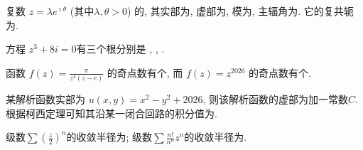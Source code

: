 \documentclass{njustexam}
\begin{document}
\renewcommand{\course}{数学物理方法}                          %
\renewcommand{\duration}{120}                                            %
\renewcommand{\credit}{5}                                                   %
\renewcommand{\syllabus}{11044102}                               %
\renewcommand{\fullmark}{100}                                            %
\renewcommand{\composer}{罗凯}            %
\renewcommand{\composedate}{2026年1月}                   %
\renewcommand{\validator}{}                                        %
\renewcommand{\coursetype}{1}                                            %
\renewcommand{\exammethod}{1}                                         %
\renewcommand{\testpaper}{A}                                              %

\makehead %



\begin{problem}
  复数 $z = \lambda e^{\imath \theta}$ (其中$\lambda, \theta  > 0$) 的, 
  其实部为\fillout{$\lambda \cos \theta$}, 虚部为\fillout{$\lambda \sin \theta$}, 
  模为\fillout{$\lambda$}, 主辐角为\fillout{$\theta$}. 
 它的复共轭为.
  \end{problem}
  
  \begin{problem}
  方程 $z^3 + 8 i  = 0$有三个根分别是
  , , .
  \end{problem}
  
  \begin{problem}
  函数 $f(z)=\frac{\pi}{z^4(z-e)}$ 的奇点数有个, 而 $f(z)=z^{2026}$ 的奇点数有个. 
  \end{problem}
  
  \begin{problem}
  某解析函数实部为 $u(x, y) = x^2 - y^2 + 2026$, 则该解析函数的虚部为加一常数$C$.
  根据柯西定理可知其沿某一闭合回路的积分值为. 
  \end{problem}
  
  \begin{problem}
  级数$\sum (\frac{z}{2})^n$的收敛半径为;
  级数$\sum \frac{n !}{n^n} z^n$的收敛半径为. 
 \end{problem}
\end{document}

